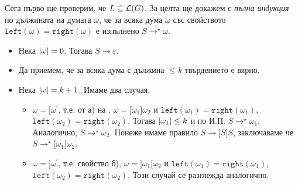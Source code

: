 \begin{hint}
  Сега първо ще проверим, че $L \subseteq \mathcal{L}(G)$.
  За целта ще докажем с {\em пълна индукция} по дължината на думата $\omega$, че за всяка дума $\omega$ със свойството $\texttt{left}(\omega) = \texttt{right}(\omega)$ е изпълнено
  $S \rightarrow^\star \omega$.
  \begin{itemize}
  \item 
    Нека $\vert{\omega}\vert = 0$. Тогава $S \rightarrow \varepsilon$.
  \item
    Да приемем, че за всяка дума с дължина $\leq k$ твърдението е вярно.
  \item
    Нека $\vert{\omega}\vert = k+1$. Имаме два случая.
    \begin{itemize}
    \item 
      $\omega = \texttt{[}\omega^\prime$, т.е. от а) на , 
      $\omega = \texttt{[}\omega_1\texttt{]}\omega_2$ и $\texttt{left}(\omega_1) = \texttt{right}(\omega_1)$, $\texttt{left}(\omega_2) = \texttt{right}(\omega_2)$.
      Тогава $\vert{\omega_1}\vert \leq k$ и по И.П. $S \rightarrow^\star \omega_1$.
      Аналогично, $S \rightarrow^\star \omega_2$.
      Понеже имаме правило $S \rightarrow \texttt{[}S\texttt{]}S$, заключаваме че 
      $S \to^\star \texttt{[}\omega_1\texttt{]}\omega_2$.
    \item
      $\omega = \texttt{]}\omega^\prime$, т.е. свойство б), $\omega = \texttt{]}\omega_1\texttt{[}\omega_2$ и 
      $\texttt{left}(\omega_1) = \texttt{right}(\omega_1)$, $\texttt{left}(\omega_2) = \texttt{right}(\omega_2)$.
      Този случай се разглежда аналогично.
    \end{itemize}
  \end{itemize}
  

\end{hint}
